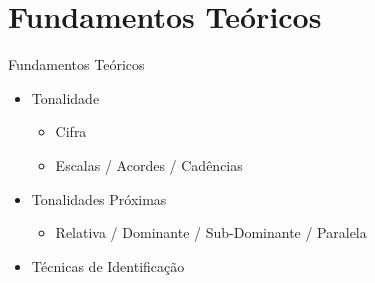 \section{Fundamentos Teóricos}
\begin{frame}{Fundamentos Teóricos}{}
\begin{itemize}
    \item Tonalidade
    \begin{itemize}
        \item Cifra
        \item Escalas / Acordes / Cadências
    \end{itemize}
    \item Tonalidades Próximas
    \begin{itemize}
        \item Relativa / Dominante / Sub-Dominante / Paralela
    \end{itemize}
    \item Técnicas de Identificação
\end{itemize}
\end{frame}

